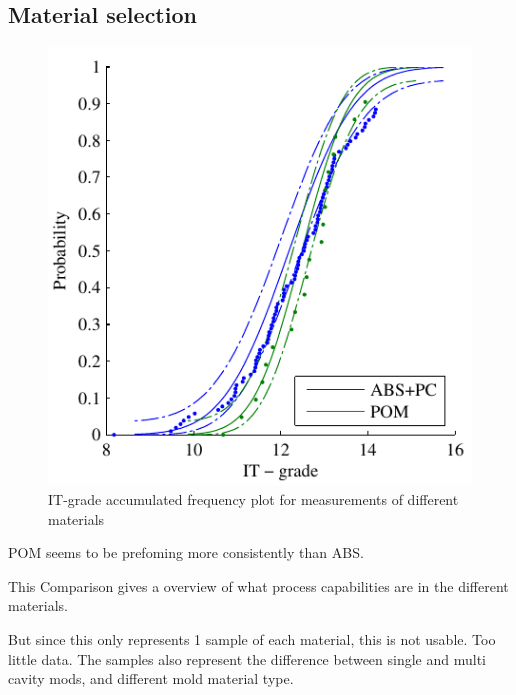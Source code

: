 \documentclass[aip,amsmath, reprint, author-year,nobalancelastpage]{revtex4-1}
\begin{document}
\subsection{Material selection}
\begin{figure}[H]
\includegraphics{ITG_material.pdf}
\caption{\label{fig:CA_inside} IT-grade accumulated frequency plot for measurements of different materials}
\end{figure}

POM seems to be prefoming more consistently than ABS.

This Comparison gives a overview of what process capabilities are in the different materials.

But since this only represents 1 sample of each material, this is not usable. Too little data. 
The samples also represent the difference between single and multi cavity mods, and different mold material type. 

	
\newpage
\end{document}
